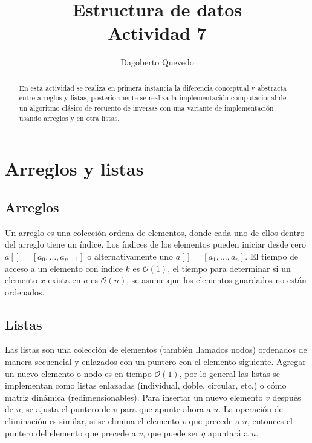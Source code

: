 \documentclass[letterpaper,11pt]{article}
\begin{document}
\title{Estructura de datos\\\large Actividad 7}
\author{Dagoberto Quevedo}
\maketitle

\begin{abstract}
En esta actividad se realiza en primera instancia la diferencia conceptual y abstracta entre arreglos y listas, posteriormente se realiza la implementación computacional de un algoritmo clásico de recuento de inversas con una variante de implementación usando arreglos y en otra listas.
\end{abstract}

\section{Arreglos y listas}

\subsection{Arreglos}

Un arreglo es una colección ordena de elementos, donde cada uno de ellos dentro del arreglo tiene un índice. Los índices de los elementos pueden iniciar desde cero $a[]=[a_0,\dots,a_{n-1}]$ o alternativamente uno $a[]=[a_1,\dots,a_{n}]$. El tiempo de acceso a un elemento con índice $k$ es $\mathcal{O}(1)$, el tiempo para determinar si un elemento $x$ exista en $a$ es $\mathcal{O}(n)$, se asume que los elementos guardados no están ordenados.

\subsection{Listas}

Las listas son una colección de elementos (también llamados nodos) ordenados de manera secuencial y enlazados con un puntero con el elemento siguiente. Agregar un nuevo elemento o nodo es en tiempo $\mathcal{O}(1)$, por lo general las listas se implementan como listas enlazadas (individual, doble, circular, etc.) o cómo matriz dinámica (redimensionables). Para insertar un nuevo elemento $v$ después de $u$, se ajusta el puntero de $v$ para que apunte ahora a $u$. La operación de eliminación es similar, si se elimina el elemento $v$ que precede a $u$, entonces el puntero del elemento que precede a $v$, que puede ser $q$ apuntará a $u$.
\end{document}
